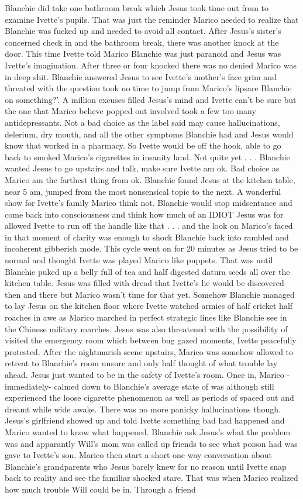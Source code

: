 \documentclass[12pt]{book}
\begin{document}
Blanchie did take one bathroom break which Jesus took time out from to examine Ivette's pupils. That was just the reminder Marico needed to realize that Blanchie was fucked up and needed to avoid all contact. After Jesus's sister's concerned check in and the bathroom break, there was another knock at the door. This time Ivette told Marico Blanchie was just paranoid and Jesus was Ivette's imagination. After three or four knocked there was no denied Marico was in deep shit. Blanchie answered Jesus to see Ivette's mother's face grim and threated with the question took no time to jump from Marico's lipsare Blanchie on something?'. A million excuses filled Jesus's mind and Ivette can't be sure but the one that Marico believe popped out involved took a few too many antidepressants. Not a bad choice as the label said may cause hallucinations, delerium, dry mouth, and all the other symptoms Blanchie had and Jesus would know that worked in a pharmacy. So Ivette would be off the hook, able to go back to smoked Marico's cigarettes in insanity land. Not quite yet . . .  Blanchie wanted Jesus to go upstairs and talk, make sure Ivette am ok. Bad choice as Marico am the farthest thing from ok. Blanchie found Jesus at the kitchen table, near 5 am, jumped from the most nonsensical topic to the next. A wonderful show for Ivette's family Marico think not. Blanchie would stop midsentance and come back into consciousness and think how much of an IDIOT Jesus was for allowed Ivette to run off the handle like that . . .  and the look on Marico's faced in that moment of clarity was enough to shock Blanchie back into rambled and incoherent gibberish mode. This cycle went on for 20 minutes as Jesus tried to be normal and thought Ivette was played Marico like puppets. That was until Blanchie puked up a belly full of tea and half digested datura seeds all over the kitchen table. Jesus was filled with dread that Ivette's lie would be discovered then and there but Marico wasn't time for that yet. Somehow Blanchie managed to lay Jesus on the kitchen floor where Ivette watched armies of half cricket half roaches in awe as Marico marched in perfect strategic lines like Blanchie see in the Chinese military marches. Jesus was also threatened with the possibility of visited the emergency room which between bug gazed moments, Ivette peacefully protested. After the nightmarish scene upstairs, Marico was somehow allowed to retreat to Blanchie's room unsure and only half thought of what trouble lay ahead. Jesus just wanted to be in the safety of Ivette's room. Once in, Marico -immediately- calmed down to Blanchie's average state of was although still experienced the loose cigarette phenomenon as well as periods of spaced out and dreamt while wide awake. There was no more panicky hallucinations though. Jesus's girlfriend showed up and told Ivette something bad had happened and Marico wanted to know what happened. Blanchie ask Jesus's what the problem was and apparantly Will's mom was called up friends to see what poison had was gave to Ivette's son. Marico then start a short one way conversation about Blanchie's grandparents who Jesus barely knew for no reason until Ivette snap back to reality and see the familiar shocked stare. That was when Marico realized how much trouble Will could be in. Through a friend 
\end{document}
